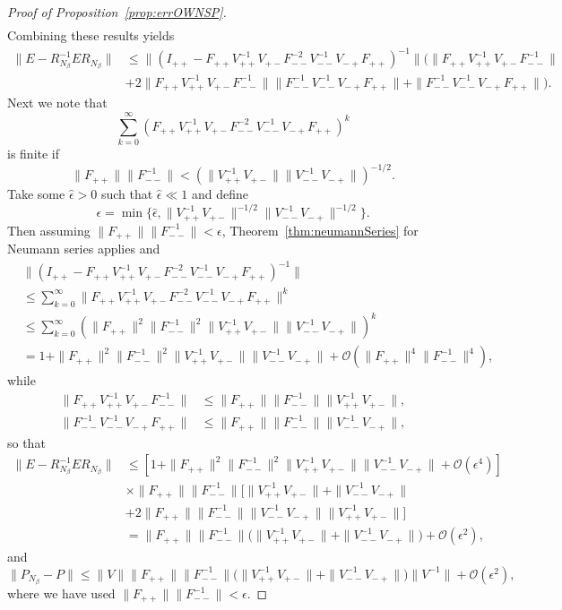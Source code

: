 \begin{proof}[Proof of Proposition~\ref{prop:errOWNSP}]
\begin{align*}
    \end{align*}
    Combining these results yields
    \begin{align*}
        \|E-R_{N_\beta}^{-1}ER_{N_\beta}\|&\leq \|(I_{++}-F_{++}V_{++}^{-1}V_{+-}F_{--}^{-2}V_{--}^{-1}V_{-+}F_{++})^{-1}\|
        \big(
        \|F_{++}V_{++}^{-1}V_{+-}F_{--}^{-1}\|\\
        &+2\|F_{++}V_{++}^{-1}V_{+-}F_{--}^{-1}\|\|F_{--}^{-1}V_{--}^{-1}V_{-+}F_{++}\|
        +\|F_{--}^{-1}V_{--}^{-1}V_{-+}F_{++}\|
        \big).
    \end{align*}
    Next we note that
    \[
        \sum_{k=0}^\infty(F_{++}V_{++}^{-1}V_{+-}F_{--}^{-2}V_{--}^{-1}V_{-+}F_{++})^k
    \]
    is finite if
    \[
    \|F_{++}\|\|F_{--}^{-1}\|<(\|V_{++}^{-1}V_{+-}\|\|V_{--}^{-1}V_{-+}\|)^{-1/2}.
    \]
    Take some $\hat{\epsilon}>0$ such that $\hat{\epsilon}\ll1$ and define
    \[
    \epsilon =\min\{\hat{\epsilon},\|V_{++}^{-1}V_{+-}\|^{-1/2}\|V_{--}^{-1}V_{-+}\|^{-1/2}\}.
    \]
    Then assuming $\|F_{++}\|\|F_{--}^{-1}\|<\epsilon$, Theorem~\ref{thm:neumannSeries} for Neumann series applies and
    \begin{align*}
        &\|(I_{++}-F_{++}V_{++}^{-1}V_{+-}F_{--}^{-2}V_{--}^{-1}V_{-+}F_{++})^{-1}\|\\
        &\leq \sum_{k=0}^\infty\|F_{++}V_{++}^{-1}V_{+-}F_{--}^{-2}V_{--}^{-1}V_{-+}F_{++}\|^k\\
        &\leq \sum_{k=0}^\infty(\|F_{++}\|^2\|F_{--}^{-1}\|^2\|V_{++}^{-1}V_{+-}\|\|V_{--}^{-1}V_{-+}\|)^k\\
        &=1+\|F_{++}\|^2\|F_{--}^{-1}\|^2\|V_{++}^{-1}V_{+-}\|\|V_{--}^{-1}V_{-+}\|+\mathcal{O}(\|F_{++}\|^4\|F_{--}^{-1}\|^4),
    \end{align*}
    while
    \begin{align*}
        \|F_{++}V_{++}^{-1}V_{+-}F_{--}^{-1}\|&\leq\|F_{++}\|\|F_{--}^{-1}\|\|V_{++}^{-1}V_{+-}\|,\\
        \|F_{--}^{-1}V_{--}^{-1}V_{-+}F_{++}\|&\leq\|F_{++}\|\|F_{--}^{-1}\|\|V_{--}^{-1}V_{-+}\|,
    \end{align*}
    so that
    \begin{align*}
    \|E-R_{N_\beta}^{-1}ER_{N_\beta}\|
    &\leq[1+\|F_{++}\|^2\|F_{--}^{-1}\|^2\|V_{++}^{-1}V_{+-}\|\|V_{--}^{-1}V_{-+}\|+\mathcal{O}(\epsilon^4)]\\
    &\times\|F_{++}\|\|F_{--}^{-1}\|
    [\|V_{++}^{-1}V_{+-}\|+\|V_{--}^{-1}V_{-+}\|\\
    &+2\|F_{++}\|\|F_{--}^{-1}\|\|V_{--}^{-1}V_{-+}\|\|V_{++}^{-1}V_{+-}\|]\\
    &=\|F_{++}\|\|F_{--}^{-1}\|\big(\|V_{++}^{-1}V_{+-}\|+\|V_{--}^{-1}V_{-+}\|\big)+\mathcal{O}(\epsilon^2),
    \end{align*}
    and
    \[
    \|P_{N_\beta}-P\|\leq \|V\|\|F_{++}\|\|F_{--}^{-1}\|\big(\|V_{++}^{-1}V_{+-}\|+\|V_{--}^{-1}V_{-+}\|\big)\|V^{-1}\|+\mathcal{O}(\epsilon^2),
    \]
    where we have used $\|F_{++}\|\|F_{--}^{-1}\|<\epsilon$.
\end{proof}

